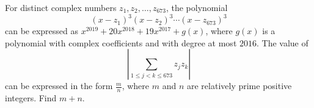 For distinct complex numbers $z_1,z_2,\dots,z_{673}$, the polynomial
\[ (x-z_1)^3(x-z_2)^3 \cdots (x-z_{673})^3 \]can be expressed as $x^{2019} + 20x^{2018} + 19x^{2017}+g(x)$, where $g(x)$ is a polynomial with complex coefficients and with degree at most $2016$. The value of
\[ \left| \sum_{1 \le j <k \le 673} z_jz_k \right| \]can be expressed in the form $\tfrac{m}{n}$, where $m$ and $n$ are relatively prime positive integers. Find $m+n$.